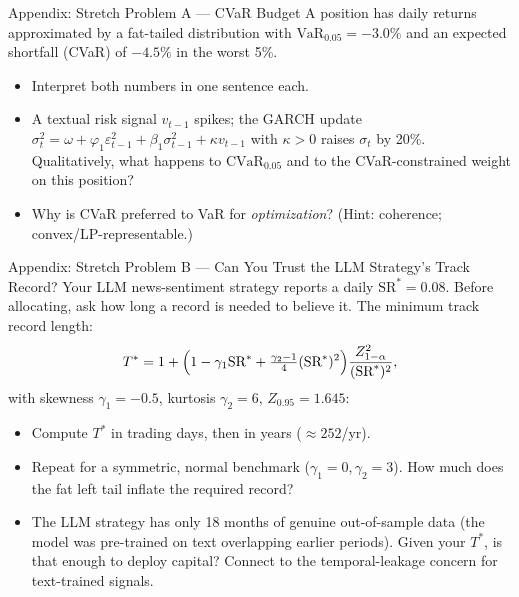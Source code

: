 \documentclass[9pt,t]{beamer}
\begin{document}

\begin{frame}[noframenumbering]{Appendix: Stretch Problem A --- CVaR Budget}
A position has daily returns approximated by a fat-tailed distribution with
$\text{VaR}_{0.05}=-3.0\%$ and an expected shortfall (CVaR) of $-4.5\%$ in the worst 5\%.

\medskip
\begin{itemize}
  \item[\textbf{A.}] Interpret both numbers in one sentence each.
  \item[\textbf{B.}] A textual risk signal $v_{t-1}$ spikes; the GARCH update
        $\sigma_t^2=\omega+\varphi_1\varepsilon_{t-1}^2+\beta_1\sigma_{t-1}^2+\kappa v_{t-1}$
        with $\kappa>0$ raises $\sigma_t$ by 20\%. Qualitatively, what happens to
        $\text{CVaR}_{0.05}$ and to the CVaR-constrained weight on this position?
  \item[\textbf{C.}] Why is CVaR preferred to VaR for \emph{optimization}?
        (Hint: coherence; convex/LP-representable.)
\end{itemize}
\end{frame}

\begin{frame}[noframenumbering]{Appendix: Stretch Problem B --- Can You Trust the LLM Strategy's Track Record?}
Your LLM news-sentiment strategy reports a daily $\text{SR}^*=0.08$. Before allocating, ask
how long a record is needed to believe it. The minimum track record length:
\[
T^*=1+\Bigl(1-\gamma_1\text{SR}^*+\tfrac{\gamma_2-1}{4}(\text{SR}^*)^2\Bigr)\frac{Z_{1-\alpha}^2}{(\text{SR}^*)^2},
\]
with skewness $\gamma_1=-0.5$, kurtosis $\gamma_2=6$, $Z_{0.95}=1.645$:

\begin{itemize}
  \item[\textbf{A.}] Compute $T^*$ in trading days, then in years ($\approx252$/yr).
  \item[\textbf{B.}] Repeat for a symmetric, normal benchmark ($\gamma_1=0,\gamma_2=3$).
        How much does the fat left tail inflate the required record?
  \item[\textbf{C.}] The LLM strategy has only 18 months of genuine out-of-sample data
        (the model was pre-trained on text overlapping earlier periods). Given your $T^*$,
        is that enough to deploy capital? Connect to the temporal-leakage concern for
        text-trained signals.
\end{itemize}
\end{frame}
\end{document}
